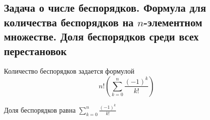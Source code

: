 \documentclass[a4paper]{article}
\begin{document}
\subsection{Задача о числе беспорядков. Формула для количества беспорядков на $n$-элементном множестве. Доля беспорядков среди всех перестановок}
 Количество беспорядков задается формулой 
\begin{equation*}
    n!\left(\sum\limits_{k=0}^n \frac{(-1)^k}{k!}\right)
\end{equation*}

 Доля беспорядков равна $\sum\limits_{k=0}^n \frac{(-1)^k}{k!}$

\end{document}
